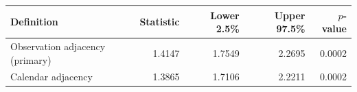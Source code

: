 \begin{tabular}{lrrrr}
\toprule
Definition & Statistic & Lower 2.5\% & Upper 97.5\% & $p$-value \\
\midrule
Observation adjacency (primary) & 1.4147 & 1.7549 & 2.2695 & 0.0002 \\
Calendar adjacency & 1.3865 & 1.7106 & 2.2211 & 0.0002 \\
\bottomrule
\end{tabular}
